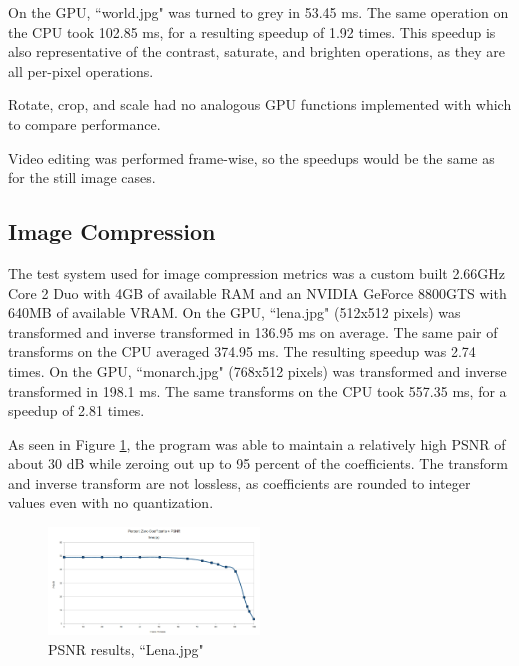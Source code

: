 \documentclass[10pt,twocolumn,twoside]{IEEEtran}
\begin{document}
On the GPU, ``world.jpg" was turned to grey in 53.45 ms. The same operation on the CPU took 102.85 ms, for a 
resulting speedup of 1.92 times. This speedup is also representative of the contrast, saturate, and brighten 
operations, as they are all per-pixel operations.

Rotate, crop, and scale had no analogous GPU functions implemented with which to compare performance. 

Video editing was performed frame-wise, so the speedups would be the same as for the still image cases.

\subsection{Image Compression}
The test system used for image compression metrics was a custom built 2.66GHz Core 2 Duo with 4GB of available 
RAM and an NVIDIA GeForce 8800GTS with 640MB of available VRAM. On the GPU, ``lena.jpg" (512x512 pixels) was 
transformed and inverse transformed in 136.95 ms on average. The same pair of transforms on the CPU averaged 
374.95 ms. The resulting speedup was 2.74 times. On the GPU, ``monarch.jpg" (768x512 pixels) was transformed 
and inverse transformed in 198.1 ms. The same transforms on the CPU took 557.35 ms, for a speedup of 2.81 
times.

As seen in Figure \ref{fig:lena_psnr}, the program was able to maintain a relatively high PSNR of about 30 dB 
while zeroing out up to 95 percent of the coefficients. The transform and inverse transform are not lossless, 
as coefficients are rounded to integer values even with no quantization.

\begin{figure}[htbp]
\begin{center}
\includegraphics[width=0.5\textwidth]{Images/lena_psnr_chart.jpg}
\caption{PSNR results, ``Lena.jpg"}
\label{fig:lena_psnr}
\end{center}
\end{figure}

\end{document}
